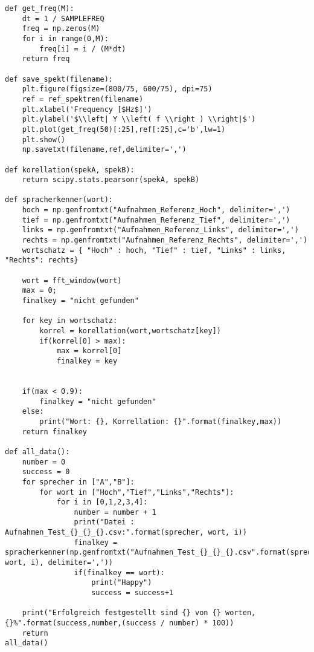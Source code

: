 \begin{lstlisting}[style=PYTHON,frame=single,
 caption=Zum einlesen der Mundharmonika Schwingung
 captionpos=b,
 label=lst:read]
def get_freq(M):
    dt = 1 / SAMPLEFREQ
    freq = np.zeros(M)    
    for i in range(0,M):
        freq[i] = i / (M*dt)
    return freq

def save_spekt(filename):
    plt.figure(figsize=(800/75, 600/75), dpi=75)
    ref = ref_spektren(filename)
    plt.xlabel('Frequency [$Hz$]')
    plt.ylabel('$\\left| Y \\left( f \\right ) \\right|$')
    plt.plot(get_freq(50)[:25],ref[:25],c='b',lw=1)
    plt.show()
    np.savetxt(filename,ref,delimiter=',')
    
def korellation(spekA, spekB):
    return scipy.stats.pearsonr(spekA, spekB)    

def spracherkenner(wort):
    hoch = np.genfromtxt("Aufnahmen_Referenz_Hoch", delimiter=',')
    tief = np.genfromtxt("Aufnahmen_Referenz_Tief", delimiter=',')
    links = np.genfromtxt("Aufnahmen_Referenz_Links", delimiter=',')
    rechts = np.genfromtxt("Aufnahmen_Referenz_Rechts", delimiter=',')
    wortschatz = { "Hoch" : hoch, "Tief" : tief, "Links" : links, "Rechts": rechts}
    
    wort = fft_window(wort)
    max = 0;
    finalkey = "nicht gefunden"
    
    for key in wortschatz:
        korrel = korellation(wort,wortschatz[key]) 
        if(korrel[0] > max):
            max = korrel[0]
            finalkey = key
    
    
    if(max < 0.9):
        finalkey = "nicht gefunden"
    else: 
        print("Wort: {}, Korrellation: {}".format(finalkey,max))
    return finalkey
    
def all_data():
    number = 0
    success = 0
    for sprecher in ["A","B"]:
        for wort in ["Hoch","Tief","Links","Rechts"]:
            for i in [0,1,2,3,4]:
                number = number + 1
                print("Datei : Aufnahmen_Test_{}_{}_{}.csv:".format(sprecher, wort, i))
                finalkey = spracherkenner(np.genfromtxt("Aufnahmen_Test_{}_{}_{}.csv".format(sprecher, wort, i), delimiter=','))
                if(finalkey == wort):
                    print("Happy") 
                    success = success+1
                    
    print("Erfolgreich festgestellt sind {} von {} worten, {}%".format(success,number,(success / number) * 100))
    return     
all_data()

\end{lstlisting}